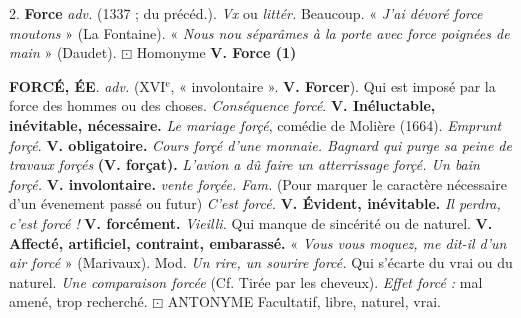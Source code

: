 2. {\bf Force} {\it adv.} (1337 ; du précéd.). {\it Vx} ou {\it littér.} Beaucoup. « {\it J'ai dévoré force moutons} » ({\sc La Fontaine}). « {\it Nous nou séparâmes à la porte avec force poignées de main} » ({\sc Daudet}). $\boxdot$ {\sc Homonyme} {\bf V. Force (1)}

{\bf FORCÉ, ÉE}. {\it adv.} ({\footnotesize XVI}$^\text{e}$, « involontaire ». {\bf V. Forcer}).  Qui est imposé par la force des hommes ou des choses. {\it Conséquence forcé}. {\bf V. Inéluctable, inévitable, nécessaire.} {\it Le mariage forçé}, comédie de Molière (1664). {\it Emprunt forçé}. {\bf V. obligatoire.} {\it Cours forçé d'une monnaie. Bagnard qui purge sa peine de travaux forçés} {\bf (V. forçat).} {\it L'avion a dû faire un atterrissage forçé. Un bain forçé.} {\bf V. involontaire.} {\it vente forçée. \lb Fam.} (Pour marquer le caractère nécessaire d'un évenement passé ou futur) {\it C'est forcé.} {\bf V. Évident, inévitable.} {\it Il perdra, c'est forcé !} {\bf V. forcément.}  {\it Vieilli.} Qui manque de sincérité ou de naturel. {\bf V. Affecté, artificiel, contraint, embarassé.} « {\it Vous vous moquez, me dit-il d'un air forcé} » ({\sc Marivaux}). Mod. {\it Un rire, un sourire forcé.}  Qui s'écarte du vrai ou du naturel. {\it Une comparaison forcée} (Cf. Tirée par les cheveux). {\it Effet forcé :} mal amené, trop recherché. $\boxdot$ {\sc ANTONYME} \si{Facultatif, libre, naturel, vrai.}
